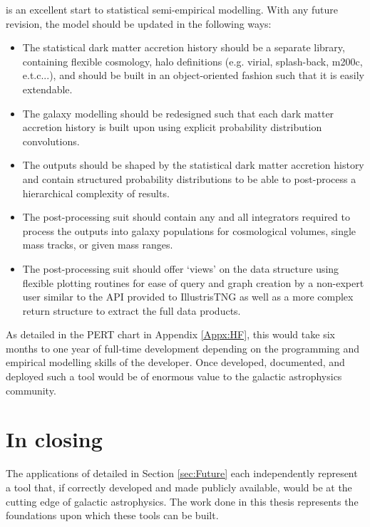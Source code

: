 \steel is an excellent start to statistical semi-empirical modelling. With any future revision, the model should be updated in the following ways:

\begin{itemize}
    \item The statistical dark matter accretion history should be a separate library, containing flexible cosmology, halo definitions (e.g. virial, splash-back, m200c, e.t.c...), and should be built in an object-oriented fashion such that it is easily extendable.
    \item The galaxy modelling should be redesigned such that each dark matter accretion history is built upon using explicit probability distribution convolutions.
    \item The outputs should be shaped by the statistical dark matter accretion history and contain structured probability distributions to be able to post-process a hierarchical complexity of results.
    \item The post-processing suit should contain any and all integrators required to process the outputs into galaxy populations for cosmological volumes, single mass tracks, or given mass ranges.
    \item The post-processing suit should offer `views' on the data structure using flexible plotting routines for ease of query and graph creation by a non-expert user similar to the API provided to IllustrisTNG \cite[][https://www.tng-project.org/data/vis/]{Nelson2019TheRelease} as well as a more complex return structure to extract the full data products.
\end{itemize}

As detailed in the PERT chart in Appendix \ref{Appx:HF}, this would take six months to one year of full-time development depending on the programming and empirical modelling skills of the developer. Once developed, documented, and deployed such a tool would be of enormous value to the galactic astrophysics community. 

\section{In closing}

The applications of \steel detailed in Section \ref{sec:Future} each independently represent a tool that, if correctly developed and made publicly available, would be at the cutting edge of galactic astrophysics. The work done in this thesis represents the foundations upon which these tools can be built. 

